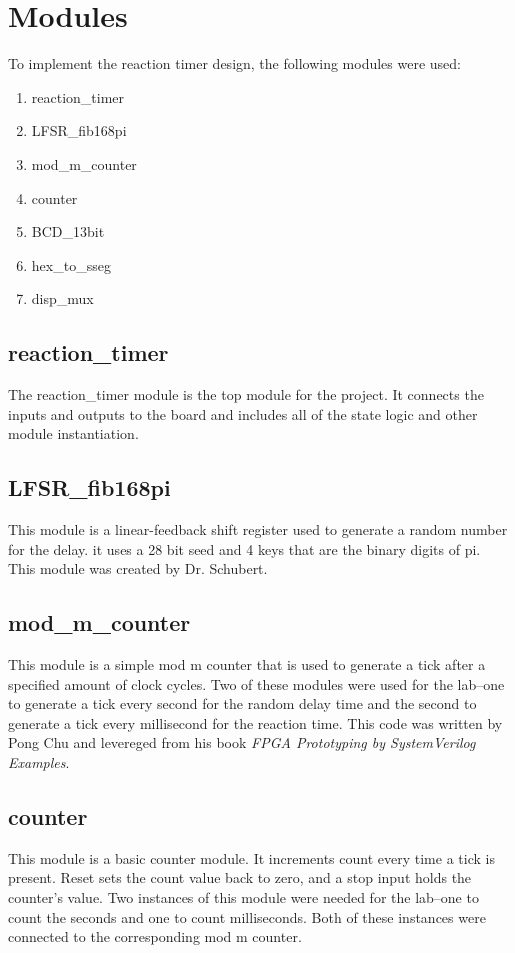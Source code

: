 \documentclass{article}
\begin{document}
\section{Modules}
To implement the reaction timer design, the following modules were used:
\begin{enumerate}
	\item reaction\_timer
	\item LFSR\_fib168pi
	\item mod\_m\_counter
	\item counter
	\item BCD\_13bit
	\item hex\_to\_sseg
	\item disp\_mux
\end{enumerate}

\subsection{reaction\_timer}
The reaction\_timer module is the top module for the project. It connects the inputs and outputs to the board and includes all of the state logic and other module instantiation.

\subsection{LFSR\_fib168pi}
This module is a linear-feedback shift register used to generate a random number for the delay. it uses a 28 bit seed and 4 keys that are the binary digits of pi. This module was created by Dr. Schubert.

\subsection{mod\_m\_counter}
This module is a simple mod m counter that is used to generate a tick after a specified amount of clock cycles. Two of these modules were used for the lab--one to generate a tick every second for the random delay time and the second to generate a tick every millisecond for the reaction time. This code was written by Pong Chu and levereged from his book \textit{FPGA Prototyping by SystemVerilog Examples}.

\subsection{counter}
This module is a basic counter module. It increments count every time a tick is present. Reset sets the count value back to zero, and a stop input holds the counter's value. Two instances of this module were needed for the lab--one to count the seconds and one to count milliseconds. Both of these instances were connected to the corresponding mod m counter.
\end{document}
